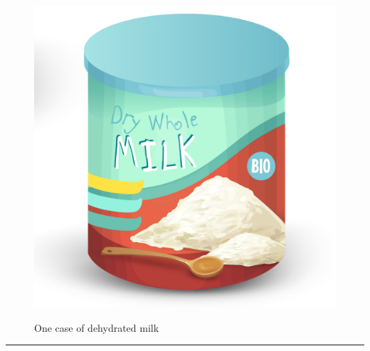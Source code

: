 \documentclass{article}
\begin{document}
    \begin{figure}[H]
        \centering
        \begin{minipage}{0.25\textwidth}
            \centering
            \includegraphics[width=\textwidth]{../SurvivalItemImages/milk}
        \end{minipage}\hfill
        \begin{minipage}{0.7\textwidth}
            \centering
            \Large One case of dehydrated milk
        \end{minipage}
    \end{figure}
    \vspace{-0.8em}
    \noindent\rule{\textwidth}{0.4pt}
            
    \clearpage
\end{document}
